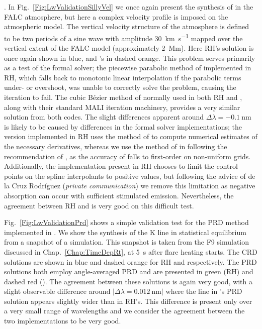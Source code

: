 .
In Fig.~\ref{Fig:LwValidationSillyVel} we once again present the synthesis of \CaLine{} in the FALC atmosphere, but here a complex velocity profile is imposed on the atmospheric model.
The vertical velocity structure of the atmosphere is defined to be two periods of a sine wave with amplitude \SI{30}{\kilo\metre\per\second} mapped over the vertical extent of the FALC model (approximately \SI{2}{\mega\metre}).
Here RH's solution is once again shown in blue, and \Lw{}'s in dashed orange.
This problem serves primarily as a test of the formal solver; the piecewise parabolic method of \citet{Auer1994} implemented in RH, which falls back to monotonic linear interpolation if the parabolic terms under- or overshoot, was unable to correctly solve the problem, causing the iteration to fail.
The cubic Bézier method of \citet{DelaCruzRodriguez2013} normally used in both RH and \Lw{}, along with their standard MALI iteration machinery, provides a very similar solution from both codes.
The slight differences apparent around $\Delta\lambda=\SI{-0.1}{\nano\metre}$ is likely to be caused by differences in the formal solver implementations; the version implemented in RH uses the method of \citet{Fritsch1984} to compute numerical estimates of the necessary derivatives, whereas we use the method of \citet{Steffen1990} in \Lw{} following the recommendation of \citet{Janett2018}, as the accuracy of \citet{Fritsch1984} falls to first-order on non-uniform grids.
Additionally, the implementation present in RH chooses to limit the control points on the spline interpolants to positive values, but following the advice of de la Cruz Rodríguez (\emph{private communication}) we remove this limitation as negative absorption can occur with sufficient stimulated emission.
Nevertheless, the agreement between RH and \Lw{} is very good on this difficult test.

Fig.~\ref{Fig:LwValidationPrd} shows a simple validation test for the PRD method implemented in \Lw{}.
We show the synthesis of the \Caii{} K line in statistical equilibrium from a snapshot of a \Radyn{} simulation.
This snapshot is taken from the F9 simulation discussed in Chap.~\ref{Chap:TimeDepRt}, at \SI{5}{\second} after flare heating starts.
The CRD solutions are shown in blue and dashed orange for RH and \Lw{} respectively.
The PRD solutions both employ angle-averaged PRD and are presented in green (RH) and dashed red (\Lw{}).
The agreement between these solutions is again very good, with a slight observable difference around $|\Delta\lambda=\SI{0.012}{\nano\metre}|$ where the line in \Lw{}'s PRD solution appears slightly wider than in RH's.
This difference is present only over a very small range of wavelengths and we consider the agreement between the two implementations to be very good.

